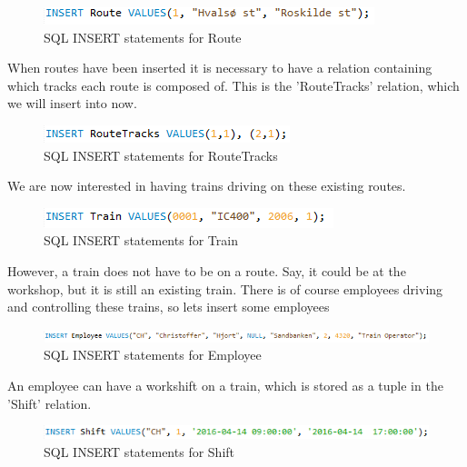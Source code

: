 \begin{figure}[ht!]
    \centering
    \includegraphics[width=.6\textwidth]{img/INSERT_Statements_Route}
    \caption{SQL INSERT statements for Route}
    \label{fig:ER}
\end{figure}

When routes have been inserted it is necessary to have a relation containing which tracks each route is composed of. This is the 'RouteTracks' relation, which we will insert into now.

\begin{figure}[ht!]
    \centering
    \includegraphics[width=.5\textwidth]{img/INSERT_Statements_RouteTracks}
    \caption{SQL INSERT statements for RouteTracks}
    \label{fig:ER}
\end{figure}

We are now interested in having trains driving on these existing routes.

\begin{figure}[ht!]
    \centering
    \includegraphics[width=.5\textwidth]{img/INSERT_Statements_Train}
    \caption{SQL INSERT statements for Train}
    \label{fig:ER}
\end{figure}

However, a train does not have to be on a route. Say, it could be at the workshop, but it is still an existing train.
\newpage
There is of course employees driving and controlling these trains, so lets insert some employees

\begin{figure}[ht!]
    \centering
    \includegraphics[width=1\textwidth]{img/INSERT_Statements_Employee}
    \caption{SQL INSERT statements for Employee}
    \label{fig:ER}
\end{figure}

An employee can have a workshift on a train, which is stored as a tuple in the 'Shift' relation.

\begin{figure}[ht!]
    \centering
    \includegraphics[width=.9\textwidth]{img/INSERT_Statements_Shift}
    \caption{SQL INSERT statements for Shift}
    \label{fig:ER}
\end{figure}


